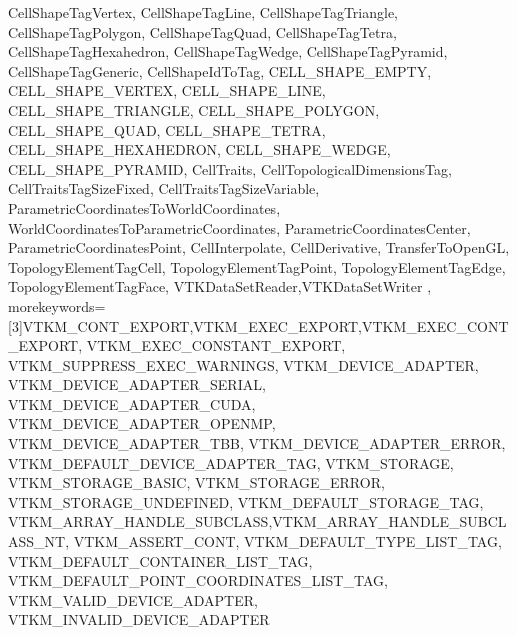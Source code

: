 {{                   CellShapeTagVertex,
                   CellShapeTagLine,
                   CellShapeTagTriangle,
                   CellShapeTagPolygon,
                   CellShapeTagQuad,
                   CellShapeTagTetra,
                   CellShapeTagHexahedron,
                   CellShapeTagWedge,
                   CellShapeTagPyramid,
                   CellShapeTagGeneric,
                   CellShapeIdToTag,
                   CELL_SHAPE_EMPTY,
                   CELL_SHAPE_VERTEX,
                   CELL_SHAPE_LINE,
                   CELL_SHAPE_TRIANGLE,
                   CELL_SHAPE_POLYGON,
                   CELL_SHAPE_QUAD,
                   CELL_SHAPE_TETRA,
                   CELL_SHAPE_HEXAHEDRON,
                   CELL_SHAPE_WEDGE,
                   CELL_SHAPE_PYRAMID,
                   CellTraits,
                   CellTopologicalDimensionsTag,
                   CellTraitsTagSizeFixed,
                   CellTraitsTagSizeVariable,
                   ParametricCoordinatesToWorldCoordinates,
                   WorldCoordinatesToParametricCoordinates,
                   ParametricCoordinatesCenter,
                   ParametricCoordinatesPoint,
                   CellInterpolate,
                   CellDerivative,
                   TransferToOpenGL,
                   TopologyElementTagCell,
                   TopologyElementTagPoint,
                   TopologyElementTagEdge,
                   TopologyElementTagFace,
                   VTKDataSetReader,VTKDataSetWriter
                   },
  morekeywords={[3]VTKM_CONT_EXPORT,VTKM_EXEC_EXPORT,VTKM_EXEC_CONT_EXPORT,
                   VTKM_EXEC_CONSTANT_EXPORT,
                   VTKM_SUPPRESS_EXEC_WARNINGS,
                   VTKM_DEVICE_ADAPTER,
                   VTKM_DEVICE_ADAPTER_SERIAL,
                   VTKM_DEVICE_ADAPTER_CUDA,
                   VTKM_DEVICE_ADAPTER_OPENMP,
                   VTKM_DEVICE_ADAPTER_TBB,
                   VTKM_DEVICE_ADAPTER_ERROR,
                   VTKM_DEFAULT_DEVICE_ADAPTER_TAG,
                   VTKM_STORAGE,
                   VTKM_STORAGE_BASIC,
                   VTKM_STORAGE_ERROR,
                   VTKM_STORAGE_UNDEFINED,
                   VTKM_DEFAULT_STORAGE_TAG,
                   VTKM_ARRAY_HANDLE_SUBCLASS,VTKM_ARRAY_HANDLE_SUBCLASS_NT,
                   VTKM_ASSERT_CONT,
                   VTKM_DEFAULT_TYPE_LIST_TAG,
                   VTKM_DEFAULT_CONTAINER_LIST_TAG,
                   VTKM_DEFAULT_POINT_COORDINATES_LIST_TAG,
                   VTKM_VALID_DEVICE_ADAPTER,
                   VTKM_INVALID_DEVICE_ADAPTER
}}
